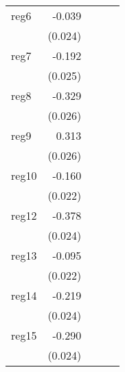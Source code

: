 {\begin{longtable}{l*{4}{D{.}{.}{-1}}}
\addlinespace
reg6        &      -0.039         &                     &                     &                     \\
            &     (0.024)         &                     &                     &                     \\
\addlinespace
reg7        &      -0.192\sym{***}&                     &                     &                     \\
            &     (0.025)         &                     &                     &                     \\
\addlinespace
reg8        &      -0.329\sym{***}&                     &                     &                     \\
            &     (0.026)         &                     &                     &                     \\
\addlinespace
reg9        &       0.313\sym{***}&                     &                     &                     \\
            &     (0.026)         &                     &                     &                     \\
\addlinespace
reg10       &      -0.160\sym{***}&                     &                     &                     \\
            &     (0.022)         &                     &                     &                     \\
\addlinespace
reg12       &      -0.378\sym{***}&                     &                     &                     \\
            &     (0.024)         &                     &                     &                     \\
\addlinespace
reg13       &      -0.095\sym{***}&                     &                     &                     \\
            &     (0.022)         &                     &                     &                     \\
\addlinespace
reg14       &      -0.219\sym{***}&                     &                     &                     \\
            &     (0.024)         &                     &                     &                     \\
\addlinespace
reg15       &      -0.290\sym{***}&                     &                     &                     \\
            &     (0.024)         &                     &                     &                     \\

\end{longtable}}
